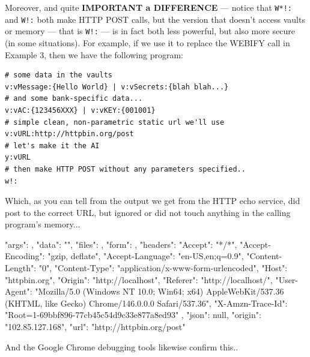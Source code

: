 \documentclass[a4paper, 18pt]{book} %
\begin{document}
{{{  
 Moreover, and quite \textbf{IMPORTANT a DIFFERENCE} --- notice that \texttt{W*!:} and \texttt{W!:} both make HTTP POST calls, but the version that doesn't access vaults or memory --- that is \texttt{W!:} --- is in fact both less powerful, but also more secure (in some situations). For example, if we use it to replace the WEBIFY call in Example 3, then we have the following program:
 
 
  \vspace{2em}

  \begin{tcolorbox}[teaterminalstyle, title=W: EXAMPLE 4: A Simple HTTP POST - real - with no explicit parameters, breakable]
  \begin{lstlisting}[language=TEA,breaklines=true,]
# some data in the vaults
v:vMessage:{Hello World} | v:vSecrets:{blah blah...}
# and some bank-specific data...
v:vAC:{123456XXX} | v:vKEY:{001001}
# simple clean, non-parametric static url we'll use
v:vURL:http://httpbin.org/post
# let's make it the AI
y:vURL
# then make HTTP POST without any parameters specified..
w!:
   \end{lstlisting}
  \end{tcolorbox}

\vspace{1em}
 
 Which, as you can tell from the output we get from the HTTP echo service, did post to the correct URL, but ignored or did not touch anything in the calling program's memory...
 
 
  
 \vspace{2em}
 \begin{tcbverbatim}[title=Sample OUTPUT 4 from EXAMPLE 4]
{
  "args": {}, 
  "data": "", 
  "files": {}, 
  "form": {}, 
  "headers": {
    "Accept": "*/*", 
    "Accept-Encoding": "gzip, deflate", 
    "Accept-Language": "en-US,en;q=0.9", 
    "Content-Length": "0", 
    "Content-Type": "application/x-www-form-urlencoded", 
    "Host": "httpbin.org", 
    "Origin": "http://localhost", 
    "Referer": "http://localhost/", 
    "User-Agent": "Mozilla/5.0 (Windows NT 10.0; Win64; x64) AppleWebKit/537.36 (KHTML, like Gecko) Chrome/146.0.0.0 Safari/537.36", 
    "X-Amzn-Trace-Id": "Root=1-69bbf896-77cb45c54d9c33e877a8ed93"
  }, 
  "json": null, 
  "origin": "102.85.127.168", 
  "url": "http://httpbin.org/post"
}
  \end{tcbverbatim}
 \vspace{2em} 
 
  
 And the Google Chrome debugging tools likewise confirm this..
 
}}}
\end{document}
